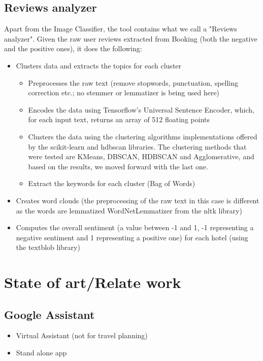 \documentclass[runningheads,a4paper,11pt]{report}
\begin{document}
\section{Reviews analyzer}
Apart from the Image Classifier, the tool contains what we call a "Reviews analyzer". Given the raw user reviews extracted from Booking (both the negative and the positive ones), it does the following:
\begin{itemize}
	\item Clusters data and extracts the topics for each cluster
	\begin{itemize}
		\item Preprocesses the raw text (remove stopwords, punctuation, spelling correction etc.; no stemmer or lemmatizer is being used here)
		\item Encodes the data using Tensorflow's Universal Sentence Encoder, which, for each input text, returns an array of 512 floating points
		\item Clusters the data using the clustering algorithms implementations offered by the scikit-learn and hdbscan libraries. The clustering methods that were tested are KMeans, DBSCAN, HDBSCAN and Agglomerative, and based on the results, we moved forward with the last one.
		\item Extract the keywords for each cluster (Bag of Words)
	\end{itemize}
	\item Creates word clouds (the preprocessing of the raw text in this case is different as the words are lemmatized WordNetLemmatizer from the nltk library)
	\item Computes the overall sentiment (a value between -1 and 1, -1 representing a negative sentiment and 1 representing a positive one) for each hotel (using the textblob library)
\end{itemize}

		
\chapter{State of art/Relate work}
\label{chapter:stateOfArt}
\section*{Google Assistant}
\begin{itemize}
	\item Virtual Assistant (not for travel planning)
	\item Stand alone app
\end{itemize} 
\end{document}

